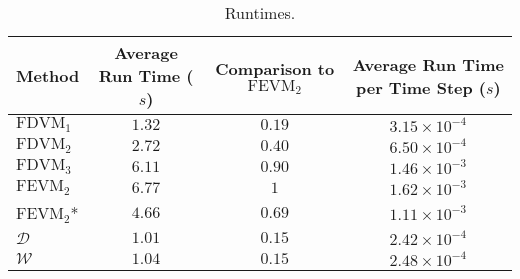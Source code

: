 \documentclass[12pt]{article}
\begin{document}
\begin{table}
	\centering
	\begin{tabular}{l |c|c|c}
		Method & Average Run Time ($s$) & Comparison to $\text{FEVM}_2$  & Average Run Time per Time Step ($s$) \\
		\hline
		$\text{FDVM}_1$ & $1.32$ & $0.19$ & $3.15 \times 10^{-4}$\\
		$\text{FDVM}_2$ & $2.72$ & $0.40$ & $6.50 \times 10^{-4}$ \\
		$\text{FDVM}_3$ & $6.11$ &$0.90$ & $1.46 \times 10^{-3}$\\
		$\text{FEVM}_2$ & $6.77$& $1$  & $1.62 \times 10^{-3}$\\
		$\text{FEVM}_2$* & $4.66$& $0.69$  & $1.11 \times 10^{-3}$\\
		$\mathcal{D}$ & $1.01$ & $0.15$ & $2.42 \times 10^{-4}$ \\
		$\mathcal{W}$ & $1.04$ & $0.15$ &  $2.48 \times 10^{-4}$
	\end{tabular}
	\caption{Runtimes.}
	\label{tab:ConservationSegurFEVM1cm}
\end{table} 

 
\end{document}
